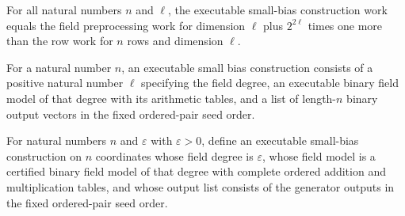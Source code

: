 \begin{theorem}
\label{FABL.executableSmallBiasConstructionWork_eq}
\leanok
{}
For all natural numbers $n$ and $\ell$, the executable small-bias construction work
equals the field preprocessing work for dimension $\ell$ plus $2^{2\ell}$ times one more
than the row work for $n$ rows and dimension $\ell$.
\end{theorem}

\begin{definition}
\label{FABL.ExecutableSmallBiasConstruction}
\leanok
{}
For a natural number $n$, an executable small bias construction consists of a positive
natural number $\ell$ specifying the field degree, an executable binary field model of
that degree with its arithmetic tables, and a list of length-$n$ binary output vectors
in the fixed ordered-pair seed order.
\end{definition}

\begin{definition}
\label{FABL.buildExecutableSmallBiasConstruction}
\leanok
{}
For natural numbers $n$ and $\varepsilon$ with $\varepsilon > 0$, define an executable small-bias
construction on $n$ coordinates whose field degree is $\varepsilon$, whose field model is a
certified binary field model of that degree with complete ordered addition and
multiplication tables, and whose output list consists of the generator outputs in the
fixed ordered-pair seed order.
\end{definition}

